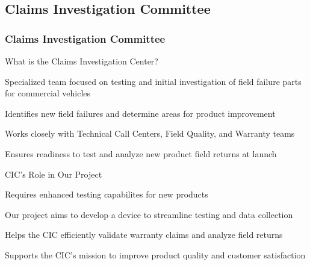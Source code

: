 \documentclass[8pt,compress,aspectratio=169]{beamer}
\begin{document}
\subsection{Claims Investigation Committee}
\begin{frame}
  \frametitle{Claims Investigation Committee}
  \begin{block}{What is the Claims Investigation Center?}
      \begin{itemize}
          \small {
            \item Specialized team focused on testing and initial investigation of field failure parts for commercial vehicles 
            \item Identifies new field failures and determine areas for product improvement
            \item Works closely with Technical Call Centers, Field Quality, and Warranty teams
            \item Ensures readiness to test and analyze new product field returns at launch  
          }
      \end{itemize}
  \end{block}


  \begin{block}{CIC's Role in Our Project}
    \begin{itemize}
        \small {
          \item Requires enhanced testing capabilites for new products
          \item Our project aims to develop a device to streamline testing and data collection
          \item Helps the CIC efficiently validate warranty claims and analyze field returns
          \item Supports the CIC's mission to improve product quality and customer satisfaction
          }
    \end{itemize}
  \end{block}
  \end{frame}
\end{document}
